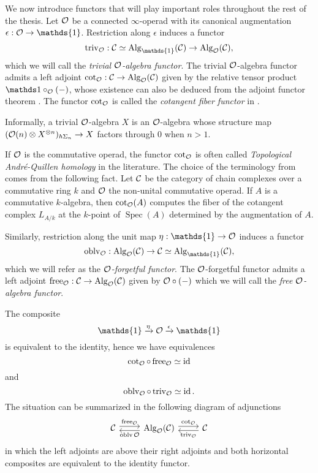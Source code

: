 We now introduce functors that will play important roles throughout the rest of the thesis. 
Let ${\mathcal{O}}$ be a connected $\infty$-operad with its canonical augmentation $\epsilon:\CO\rightarrow \mathds{1}$.
Restriction along $\epsilon$ induces a functor 
$$
\trivial_{\CO}: \CC\simeq\Alg_{\mathds{1}}(\CC)\rightarrow \Alg_{\CO}(\CC),
$$
which we will call the \emph{trivial ${\mathcal{O}}$-algebra functor}.
The trivial ${\mathcal{O}}$-algebra functor admits a left adjoint $\cot_{{\mathcal{O}}}:{\mathcal{C}}\rightarrow \operatorname{Alg}_{{\mathcal{O}}}({\mathcal{C}})$ given by the relative tensor product $\triv\circ_{\CO}(-)$, whose existence can also be deduced from the adjoint functor theorem \cite[Corollary 5.5.2.9.]{HTT}. 
The functor $\cot_{{\mathcal{O}}}$ is called the \emph{cotangent fiber functor} in \cite{Heuts_Koszul}. 
\begin{remark}
Informally, a trivial ${\mathcal{O}}$-algebra $X$ is an ${\mathcal{O}}$-algebra whose structure map 
$({\mathcal{O}}(n)\otimes X^{\otimes n})_{h\Sigma_n}\to X$ factors through $0$ when $n>1$.
\end{remark}

\begin{remark}
If ${\mathcal{O}}$ is the commutative operad, the functor $\cot_{{\mathcal{O}}}$ is often called \emph{Topological Andr\'e-Quillen homology} in the literature. 
The choice of the terminology from \cite{Heuts_Koszul}
comes from the following fact.
Let ${\mathcal{C}}$ be the category of chain complexes over a commutative ring $k$ and ${\mathcal{O}}$ the non-unital commutative operad. If $A$ is a commutative $k$-algebra, then $\cot_{{\mathcal{O}}}(A)$ computes the fiber of the cotangent complex $L_{A/k}$ at the $k$-point of $\operatorname{Spec}(A)$ determined by the augmentation of $A$.
\end{remark}


Similarly, restriction along the unit map $\eta:\mathds{1}\rightarrow \CO$ induces a functor
$$
\oblv_{\CO}: \Alg_{\CO}(\CC)
\rightarrow 
\CC\simeq\Alg_{\mathds{1}}(\CC),
$$
which we will refer as the \emph{${\mathcal{O}}$-forgetful functor}.
The ${\mathcal{O}}$-forgetful functor admits a left adjoint $\operatorname{free}_{{\mathcal{O}}}:{\mathcal{C}}\rightarrow \operatorname{Alg}_{{\mathcal{O}}}({\mathcal{C}})$ given by ${\mathcal{O}}\circ (-)$ which we will call the \emph{free ${\mathcal{O}}$-algebra functor}.
    
The composite
$$
\mathds{1}\xrightarrow{\eta} \CO \xrightarrow{\epsilon} \mathds{1}
$$
is equivalent to the identity, hence we have equivalences
$$
\cot_{{\mathcal{O}}} \circ \operatorname{free}_{{\mathcal{O}}} \simeq \operatorname{id}
$$
and 
$$
\operatorname{oblv}_{{\mathcal{O}}}\circ \operatorname{triv}_{{\mathcal{O}}} \simeq \operatorname{id}.
$$
The situation can be summarized in the following diagram of adjunctions
\[
\begin{tikzcd}
\CC & \Alg_{\CO}(\CC) & \CC
	\arrow[from=1-1, to= 1-2, shift left = 1, "\Free_{\CO}" above]
	\arrow[from=1-2, to=1-1, shift left = 1, "\oblv{\CO}" below]
	\arrow[from=1-2, to= 1-3, shift left = 1, "\cot_{\CO}" above]
	\arrow[from=1-3, to=1-2, shift left = 1, "\trivial_{\CO}" below]
\end{tikzcd}
\]
in which the left adjoints are above their right adjoints and both horizontal composites are equivalent to the identity functor.

